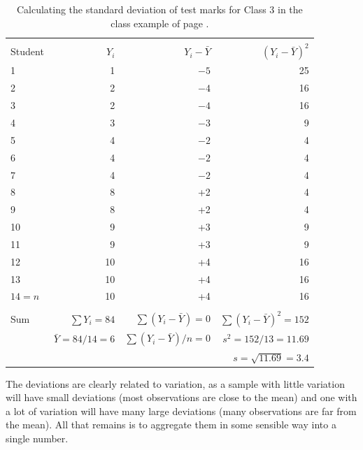 \begin{table}
\caption{Calculating the standard deviation of test marks for Class 3 in
the class example of page \pageref{p_classex}.}
\label{t_sdex}
\begin{center}
\begin{tabular}{|l|rrr|}\hline
& \multicolumn{3}{|c|}{\vspace*{-2.4ex}}\\
Student& $Y_{i}$ & $Y_{i}-\bar{Y}$ & $(Y_{i}-\bar{Y})^{2}$\\ \hline
1 & 1 & $-5$ & 25 \\
2 & 2& $-4$ & 16\\
3 & 2& $-4$ & 16\\
4 & 3& $-3$ & 9 \\
5& 4& $-2$& 4\\
6& 4& $-2$ & 4\\
7& 4& $-2$ & 4\\
8& 8& +2 & 4\\
9& 8& +2 & 4\\
10& 9& +3 & 9\\
11& 9& +3  & 9\\
12& 10& +4& 16 \\
13& 10& +4 & 16\\
$14=n$& 10& +4 & 16\\ \hline
& \multicolumn{3}{|c|}{\vspace*{-1.6ex}}\\
Sum & $\sum Y_{i}=84$&
$\sum(Y_{i}-\bar{Y})=0$
&
$\sum(Y_{i}-\bar{Y})^{2}=152$\\
& $\bar{Y}=84/14=6$ &
$\sum(Y_{i}-\bar{Y})/n=0$
& $s^{2}=152/13=11.69$ \\
& & & $s=\sqrt{11.69}=3.4$ \\
\hline
\end{tabular}
\end{center}
\end{table}

The deviations are clearly related to variation, as a sample
with little variation will have small deviations (most observations are
close to the mean) and one with a lot of variation will have many large
deviations (many observations are far from the mean). All that remains
is to aggregate them in some sensible way into a single number.

